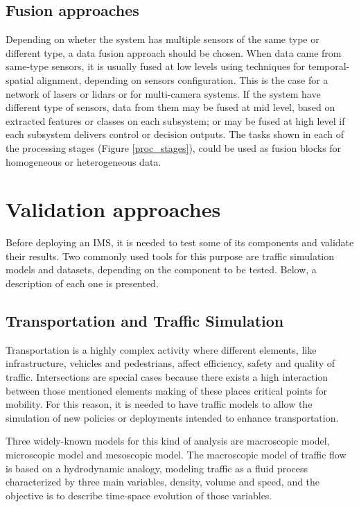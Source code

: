 \subsection{Fusion approaches}

Depending on wheter the system has multiple sensors of the same type or different type, a data fusion approach should be chosen. When data came from same-type sensors, it is usually fused at low levels using techniques for temporal-spatial alignment, depending on sensors configuration. This is the case for a network of lasers or lidars or for multi-camera systems. If the system have different type of sensors, data from them may be fused at mid level, based on extracted features or classes on each subsystem; or may be fused at high level if each subsystem delivers control or decision outputs. The tasks shown in each of the processing stages (Figure \ref{proc_stages}), could be used as fusion blocks for homogeneous or heterogeneous data.

\section{Validation approaches}

Before deploying an IMS, it is needed to test some of its components and validate their results. Two commonly used tools for this purpose are traffic simulation models and datasets, depending on the component to be tested. Below, a description of each one is presented.

\subsection{Transportation and Traffic Simulation}

Transportation is a highly complex activity where different elements, like infrastructure, vehicles and pedestrians, affect efficiency, safety and quality of traffic. Intersections are special cases because there exists a high interaction between those mentioned elements making of these places critical points for mobility. For this reason, it is needed to have traffic models to allow the simulation of new policies or deployments intended to enhance transportation.

Three widely-known models for this kind of analysis are macroscopic model, microscopic model and mesoscopic model. The macroscopic model of traffic flow is based on a hydrodynamic analogy, modeling traffic as a fluid process characterized by three main variables, density, volume and speed, and the objective is to describe time-space evolution of those variables.


